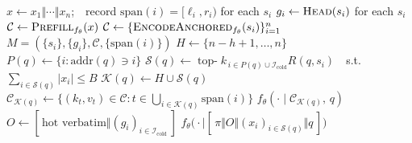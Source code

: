 \documentclass{article} %
\newcommand{\kvm}{VeraKV}
\begin{document}
\begin{algorithm}[t]
\caption{\kvm{}: build once, then select-and-serve per query. The gather step
returns the full-prefill KV of the retained positions, so the KV decode
reproduces $f_\theta^{\mathrm{mask}}$ (\S\ref{sec:method}) while re-prefilling only
$q$; the text pipeline assembles the same selection with an overview.}
\label{alg:kvm}
\begin{algorithmic}[1]
  \State $x \gets x_1\Vert\cdots\Vert x_n$;\ \ record $\mathrm{span}(i)=[\ell_i,r_i)$ for each $s_i$
  \State $g_i \gets \textsc{Head}(s_i)$ for each $s_i$ 
    \State $\mathcal{C} \gets \textsc{Prefill}_{f_\theta}(x)$ 
  \Else
    \State $\mathcal{C} \gets \{\textsc{EncodeAnchored}_{f_\theta}(s_i)\}_{i=1}^{n}$ 
  \EndIf
  \State \Return $M=(\{s_i\},\{g_i\},\mathcal{C},\{\mathrm{span}(i)\})$
\EndProcedure
\Statex
{}
  \State $H \gets \{n{-}h{+}1,\dots,n\}$ 
  \State $P(q) \gets \{i : \mathrm{addr}(q)\ni i\}$ 
  \State $\mathcal{S}(q) \gets \operatorname*{top\text{-}}k_{\,i\in P(q)\cup\mathcal{I}_{\mathrm{cold}}} R(q,s_i)$\ \ s.t.\ $\textstyle\sum_{i\in\mathcal{S}(q)}|x_i|\le B$
  \State $\mathcal{K}(q) \gets H\cup\mathcal{S}(q)$ 
    \State $\mathcal{C}_{\mathcal{K}(q)} \gets \{(k_t,v_t)\in\mathcal{C} : t\in\bigcup_{i\in\mathcal{K}(q)}\mathrm{span}(i)\}$ 
    \State \Return $f_\theta(\cdot \mid \mathcal{C}_{\mathcal{K}(q)},\, q)$ 
  \Else
    \State $O \gets [\,\text{hot verbatim} \Vert (g_i)_{i\in\mathcal{I}_{\mathrm{cold}}}\,]$ 
    \State \Return $f_\theta\big(\cdot \mid [\,\pi \Vert O \Vert (x_i)_{i\in\mathcal{S}(q)} \Vert q\,]\big)$
  \EndIf
\EndProcedure
\end{algorithmic}
\end{algorithm}
\end{document}
